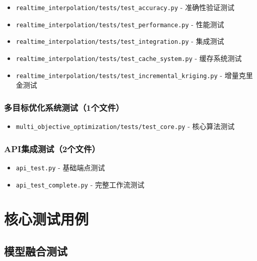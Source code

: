 \documentclass[12pt,a4paper,openany]{report}
\begin{document}
\begin{itemize}
    \item \texttt{realtime\_interpolation/tests/test\_accuracy.py} - 准确性验证测试
    \item \texttt{realtime\_interpolation/tests/test\_performance.py} - 性能测试
    \item \texttt{realtime\_interpolation/tests/test\_integration.py} - 集成测试
    \item \texttt{realtime\_interpolation/tests/test\_cache\_system.py} - 缓存系统测试
    \item \texttt{realtime\_interpolation/tests/test\_incremental\_kriging.py} - 增量克里金测试
\end{itemize}

\subsubsection{多目标优化系统测试（1个文件）}

\begin{itemize}
    \item \texttt{multi\_objective\_optimization/tests/test\_core.py} - 核心算法测试
\end{itemize}

\subsubsection{API集成测试（2个文件）}

\begin{itemize}
    \item \texttt{api\_test.py} - 基础端点测试
    \item \texttt{api\_test\_complete.py} - 完整工作流测试
\end{itemize}

\section{核心测试用例}

\subsection{模型融合测试}
\end{document}
